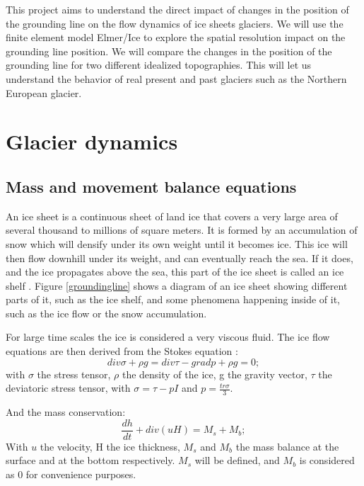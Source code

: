 \documentclass{article}
\begin{document}
 This project aims to understand the direct impact of changes in the position of the grounding line on the flow dynamics of ice sheets glaciers. We will use the finite element model Elmer/Ice to explore the spatial resolution impact on the grounding line position. We will compare the changes in the position of the grounding line for two different idealized topographies. This will let us understand the behavior of real present and past glaciers such as the Northern European glacier. 

 \section{Glacier dynamics}
 \subsection{Mass and movement balance equations}
 An ice sheet is a continuous sheet of land ice that covers a very large area of several thousand to millions of square meters. It is formed by an accumulation of snow which will densify under its own weight until it becomes ice. This ice will then flow downhill under its weight, and can eventually reach the sea. If it does, and the ice propagates above the sea, this part of the ice sheet is called an ice shelf \cite{hutter1982mathematical}. Figure \ref{groundingline} shows a diagram of an ice sheet showing different parts of it, such as the ice shelf, and some phenomena happening inside of it, such as the ice flow or the snow accumulation.

 For large time scales the ice is considered a very viscous fluid. The ice flow equations are then derived from the Stokes equation \cite{hutter1982mathematical}:
\begin{equation}
	div\sigma + \rho g = div\tau - gradp + \rho g = 0;
\end{equation}
with $\sigma$ the stress tensor, $\rho$ the density of the ice, g the gravity vector, $\tau$ the deviatoric stress tensor, with $\sigma = \tau - pI$ and $p=\frac{tr\sigma}{3}$. 

And the mass conservation:
\begin{equation}
	\frac{dh}{dt}+ div(uH)=M_s + M_b;
\end{equation}
With $u$ the velocity, H the ice thickness, $M_s$ and $M_b$ the mass balance at the surface and at the bottom respectively. $M_s$ will be defined, and $M_b$ is considered as 0 for convenience purposes. 
\end{document}

